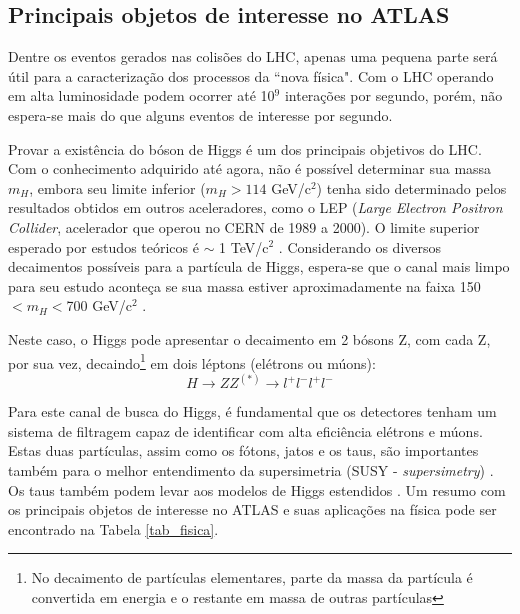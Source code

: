 \subsection{Principais objetos de interesse no ATLAS}

Dentre os eventos gerados nas colisões do LHC, apenas uma pequena
parte será útil para a caracterização dos processos da ``nova
física". Com o LHC operando em alta luminosidade podem ocorrer até
10$^9$ interações por segundo, porém, não espera-se mais do que
alguns eventos de interesse por segundo.

Provar a existência do bóson de Higgs é um dos principais objetivos
do LHC. Com o conhecimento adquirido até agora, não é possível
determinar sua massa $m_H$, embora seu limite inferior ($m_H>114$
GeV/c$^2$) tenha sido determinado pelos resultados obtidos em outros
aceleradores, como o LEP (\textit{Large Electron Positron Collider},
acelerador que operou no CERN de 1989 a 2000). O limite superior
esperado por estudos teóricos é $\sim$ 1 TeV/c$^2$
\cite{book:lhc:2008}. Considerando os diversos decaimentos possíveis
para a partícula de Higgs, espera-se que o canal mais limpo para seu
estudo aconteça se sua massa estiver aproximadamente na faixa
150$<m_H<$700 GeV/c$^2$ \cite{article:ATLAS:2008}.

Neste caso, o Higgs pode apresentar o decaimento em 2 bósons Z,
com cada Z, por sua vez, decaindo\footnote{No decaimento de
partículas elementares, parte da massa da partícula é convertida
em energia e o restante em massa de outras partículas} em dois
léptons (elétrons ou múons):
\begin{equation}\label{higgs_dec}
    H \rightarrow ZZ^{(*)} \rightarrow l^+ l^- l^+ l^-
\end{equation}

Para este canal de busca do Higgs, é fundamental que os detectores
tenham um sistema de filtragem capaz de identificar com alta
eficiência elétrons e múons. Estas duas partículas, assim como os
fótons, jatos e os taus, são importantes também para o melhor
entendimento da supersimetria (SUSY - \emph{supersimetry})
\cite{livro:fisica1:2006}. Os taus também podem levar aos modelos
de Higgs estendidos \cite{TDR2:ATLAS:1999}. Um resumo com os
principais objetos de interesse no ATLAS e suas aplicações na
física pode ser encontrado na Tabela \ref{tab_fisica}.

